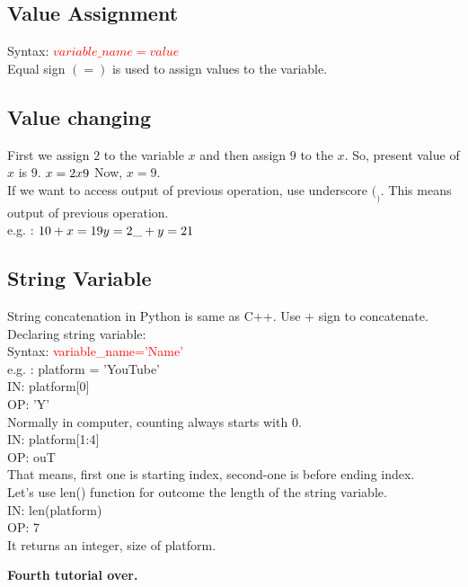 \documentclass[11 pt, letterpaper]{report}
\begin{document}
\subsection*{Value Assignment}
Syntax: \textcolor{red}{$variable\_name = value$} \\
Equal sign $( = )$ is used to assign values to the variable.
\subsection*{Value changing}
First we assign $2$ to the variable $x$ and then assign $9$ to the $x$. So, present value of $x$ is $9$.
$
x = 2\\
x  9\\
$
Now, $x=9$.
\\
If we want to access output of previous operation, use underscore $( _ )$. This means output of previous operation.
\\e.g. : $10 + x\\
= 19\\
y = 2\\
\_+ y\\
= 21\\
$
\subsection*{String Variable}
String concatenation in Python is same as C++. Use $+$ sign to concatenate.\\
Declaring string variable:\\
Syntax: \textcolor{red}{variable\_name='Name'}\\
e.g. : platform = 'YouTube'\\
IN: platform[0]\\
OP: 'Y'\\
Normally in computer, counting always starts with 0.\\
IN: platform[1:4]\\
OP: ouT\\
That means, first one is starting index, second-one is before ending index.\\
Let's use len() function for outcome the length of the string variable.\\
IN: len(platform)\\
OP: 7\\
It returns an integer, size of platform.\\
\begin{flushright}
\textbf{Fourth tutorial over.}
\end{flushright}
\end{document}
